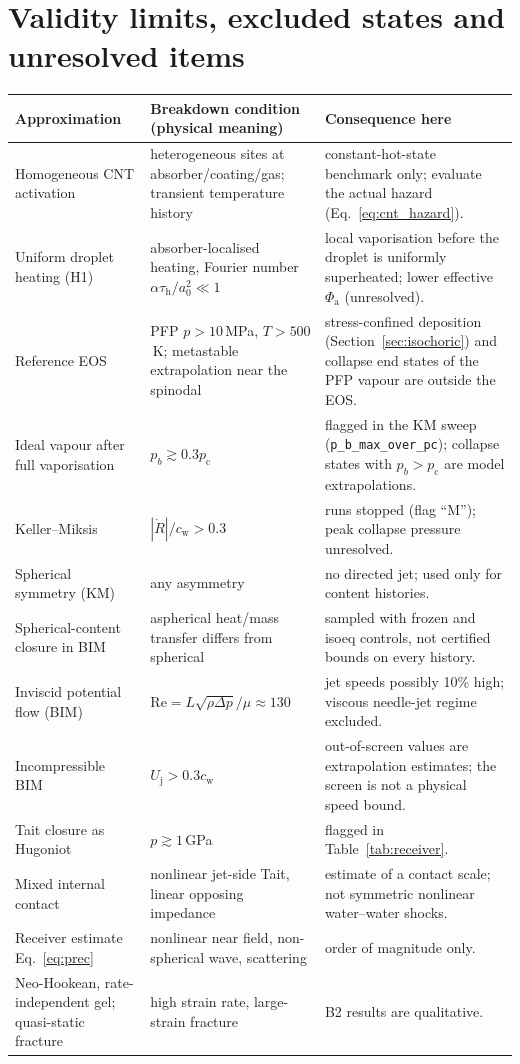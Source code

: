 \section{Validity limits, excluded states and unresolved items}\label{sec:validity}
\begin{center}\small
\begin{longtable}{p{}p{}p{}}
\toprule Approximation & Breakdown condition (physical meaning) & Consequence here\\\midrule\endhead
Homogeneous CNT activation & heterogeneous sites at absorber/coating/gas; transient temperature history &
constant-hot-state benchmark only; evaluate the actual hazard (Eq.~\eqref{eq:cnt_hazard}).\\
Uniform droplet heating (H1) & absorber-localised heating, Fourier number $\alpha\tau_{\mathrm h}/a_0^2\ll1$ & local
vaporisation before the droplet is uniformly superheated; lower effective $\Phi_{\mathrm a}$ (unresolved).\\
Reference EOS & PFP $p>10$\,MPa, $T>500$\,K; metastable extrapolation near the spinodal & stress-confined deposition
(Section~\ref{sec:isochoric}) and collapse end states of the PFP vapour are outside the EOS.\\
Ideal vapour after full vaporisation & $p_b\gtrsim0.3p_{\mathrm c}$ & flagged in the KM sweep (\texttt{p\_b\_max\_over\_pc});
collapse states with $p_b>p_{\mathrm c}$ are model extrapolations.\\
Keller--Miksis & $|\dot R|/c_{\mathrm w}>0.3$ & runs stopped (flag ``M''); peak collapse pressure unresolved.\\
Spherical symmetry (KM) & any asymmetry & no directed jet; used only for content histories.\\
Spherical-content closure in BIM & aspherical heat/mass transfer differs from spherical & sampled with frozen
and isoeq controls, not certified bounds on every history.\\
Inviscid potential flow (BIM) & $\mathrm{Re}=L\sqrt{\rho\Delta p}/\mu\approx130$ & jet speeds possibly 10\% high; viscous
needle-jet regime excluded.\\
Incompressible BIM & $U_{\mathrm j}>0.3c_{\mathrm w}$ & out-of-screen values are extrapolation estimates;
the screen is not a physical speed bound.\\
Tait closure as Hugoniot & $p\gtrsim1$\,GPa & flagged in Table~\ref{tab:receiver}.\\
Mixed internal contact & nonlinear jet-side Tait, linear opposing impedance & estimate of a contact scale;
not symmetric nonlinear water--water shocks.\\
Receiver estimate Eq.~\eqref{eq:prec} & nonlinear near field, non-spherical wave, scattering & order of magnitude only.\\
Neo-Hookean, rate-independent gel; quasi-static fracture & high strain rate, large-strain fracture & B2 results are
qualitative.\\
\bottomrule
\end{longtable}
\end{center}
